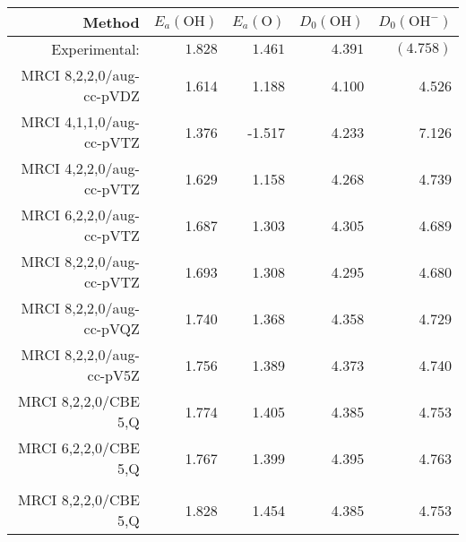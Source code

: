 \begin{tabular}{rrrrr}
\toprule
Method & $E_a(\mathrm{OH})$ & $E_a(\mathrm{O})$ & $D_0(\mathrm{OH})$ & $D_0(\mathrm{OH^-})$ \\ \midrule
Experimental:  & $1.828$ & $1.461$ & $4.391$ & $(4.758)$ \\ \midrule
MRCI 8,2,2,0/aug-cc-pVDZ & 1.614 & 1.188 & 4.100 & 4.526\\
MRCI 4,1,1,0/aug-cc-pVTZ & 1.376 & -1.517 & 4.233 & 7.126\\
MRCI 4,2,2,0/aug-cc-pVTZ & 1.629 & 1.158 & 4.268 & 4.739\\
MRCI 6,2,2,0/aug-cc-pVTZ & 1.687 & 1.303 & 4.305 & 4.689\\
MRCI 8,2,2,0/aug-cc-pVTZ & 1.693 & 1.308 & 4.295 & 4.680\\
MRCI 8,2,2,0/aug-cc-pVQZ & 1.740 & 1.368 & 4.358 & 4.729\\
MRCI 8,2,2,0/aug-cc-pV5Z & 1.756 & 1.389 & 4.373 & 4.740\\
MRCI 8,2,2,0/CBE 5,Q & 1.774 & 1.405 & 4.385 & 4.753\\
MRCI 6,2,2,0/CBE 5,Q & 1.767 & 1.399 & 4.395 & 4.763\\
\\
MRCI 8,2,2,0/CBE 5,Q & 1.828 & 1.454 & 4.385 & 4.753\\
\bottomrule
\end{tabular}
